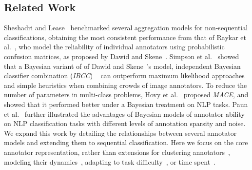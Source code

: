 \subsection{Related Work}

Sheshadri and Lease~ benchmarked several 
aggregation models for non-sequential classifications, 
obtaining the most consistent performance from 
that of Raykar et al.~, who
model the reliability of individual annotators
using probabilistic confusion matrices,
as proposed by Dawid and Skene~.
Simpson et al.~ showed that a Bayesian variant of of Dawid and Skene~'s model, independent Bayesian classifier combination
(\emph{IBCC}) ~\cite{kim2012bayesian} 
can outperform maximum likelihood approaches and simple heuristics
when combining crowds of image annotators.
To reduce the number of parameters in multi-class problems,
Hovy et al.~ proposed \emph{MACE}, 
and showed that it performed better under a Bayesian treatment on NLP tasks.
Paun et al.~ further illustrated
the advantages of Bayesian models of annotator ability on NLP classification tasks
with different levels of annotation sparsity and noise.
We expand this work by detailing the relationships between several annotator models
and extending them to sequential classification. 
Here we focus on the core annotator representation, rather than extensions 
for clustering annotators~\cite{venanzi2014community,moreno_bayesian_2015},
modeling their dynamics~\cite{simpsonlong},
adapting to task difficulty~\cite{whitehill2009whose,bachrach2012grade},
or time spent~\cite{venanzi2016time}.

